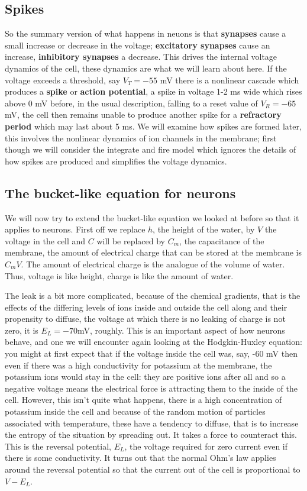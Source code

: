 \documentclass{article}
\begin{document}
\subsection*{Spikes}

So the summary version of what happens in neuons is that
\textbf{synapses} cause a small increase or decrease in the voltage;
\textbf{excitatory synapses} cause an increase, \textbf{inhibitory
  synapses} a decrease. This drives the internal voltage dynamics of
the cell, these dynamics are what we will learn about here. If the
voltage exceeds a threshold, say $V_T=-55$ mV there is a nonlinear
cascade which produces a \textbf{spike} or \textbf{action potential},
a spike in voltage 1-2 ms wide which rises above 0 mV before, in the
usual description, falling to a reset value of $V_R=-65$ mV, the cell
then remains unable to produce another spike for a \textbf{refractory
  period} which may last about 5 ms. We will examine how spikes are
formed later, this involves the nonlinear dynamics of ion channels in
the membrane; first though we will consider the integrate and fire
model which ignores the details of how spikes are produced and
simplifies the voltage dynamics.

\subsection*{The bucket-like equation for neurons}

We will now try to extend the bucket-like equation we looked at before
so that it applies to neurons. First off we replace $h$, the height of
the water, by $V$ the voltage in the cell and $C$ will be replaced by
$C_m$, the capacitance of the membrane, the amount of electrical
charge that can be stored at the membrane is $C_mV$. The amount of
electrical charge is the analogue of the volume of water. Thus,
voltage is like height, charge is like the amount of water.

The leak is a bit more complicated, because of the chemical gradients,
that is the effects of the differing levels of ions inside and outside
the cell along and their propensity to diffuse, the voltage at which
there is no leaking of charge is not zero, it is $E_L=-70 $mV,
roughly. This is an important aspect of how neurons behave, and one we
will encounter again looking at the Hodgkin-Huxley equation: you might
at first expect that if the voltage inside the cell was, say, -60 mV
then even if there was a high conductivity for potassium at the
membrane, the potassium ions would stay in the cell: they are positive
ions after all and so a negative voltage means the electrical force is
attracting them to the inside of the cell. However, this isn't quite
what happens, there is a high concentration of potassium inside the
cell and because of the random motion of particles associated with
temperature, these have a tendency to diffuse, that is to increase the
entropy of the situation by spreading out. It takes a force to
counteract this. This is the reversal potential, $E_L$, the voltage
required for zero current even if there is some conductivity. It turns
out that the normal Ohm's law applies around the reversal potential so
that the current out of the cell is proportional to $V-E_L$.
\end{document}
